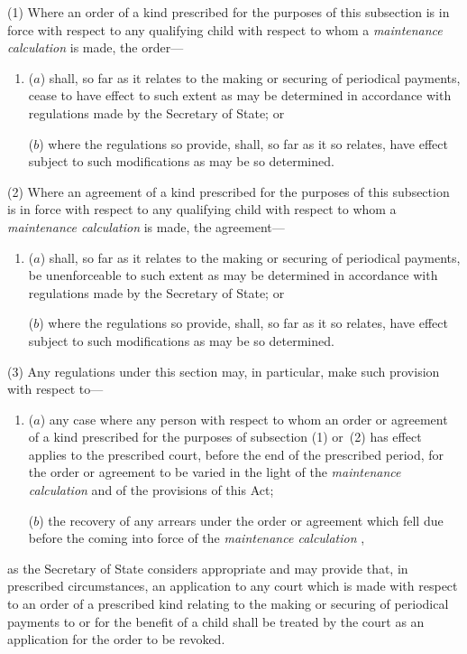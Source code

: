 \documentclass[12pt,a4paper]{article}
\begin{document}
(1) Where an order of a kind prescribed for the purposes of this subsection is in force with respect to any qualifying child with respect to whom a 
\emph{maintenance calculation}  %
is made, the order—
\begin{enumerate}\item[]
($a$) shall, so far as it relates to the making or securing of periodical payments, cease to have effect to such extent as may be determined in accordance with regulations made by the Secretary of State; or

($b$) where the regulations so provide, shall, so far as it so relates, have effect subject to such modifications as may be so determined.
\end{enumerate}

(2) Where an agreement of a kind prescribed for the purposes of this subsection is in force with respect to any qualifying child with respect to whom a 
\emph{maintenance calculation}  %
is made, the agreement—
\begin{enumerate}\item[]
($a$) shall, so far as it relates to the making or securing of periodical payments, be unenforceable to such extent as may be determined in accordance with regulations made by the Secretary of State; or

($b$) where the regulations so provide, shall, so far as it so relates, have effect subject to such modifications as may be so determined.
\end{enumerate}

(3) Any regulations under this section may, in particular, make such provision with respect to—
\begin{enumerate}\item[]
($a$) any case where any person with respect to whom an order or agreement of a kind prescribed for the purposes of subsection (1)  or~(2)  has effect applies to the prescribed court, before the end of the prescribed period, for the order or agreement to be varied in the light of the 
\emph{maintenance calculation}  %
and of the provisions of this Act;

($b$) the recovery of any arrears under the order or agreement which fell due before the coming into force of the 
\emph{maintenance calculation}%
,
\end{enumerate}
as the Secretary of State considers appropriate and may provide that, in prescribed circumstances, an application to any court which is made with respect to an order of a prescribed kind relating to the making or securing of periodical payments to or for the benefit of a child shall be treated by the court as an application for the order to be revoked.
\end{document}
